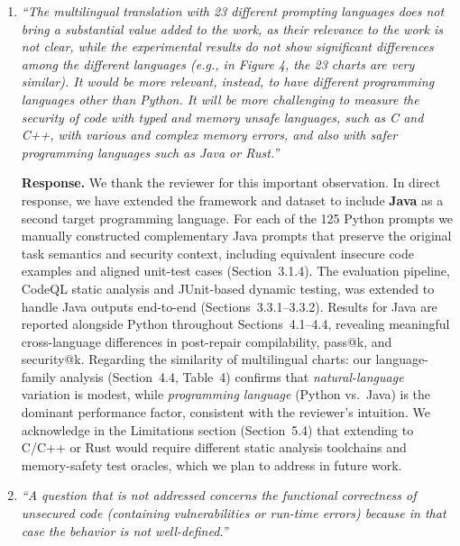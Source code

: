 \documentclass[12pt]{article}
\begin{document}
\begin{enumerate}[leftmargin=*, label=\textbf{R1.\arabic*.}]

\item \textit{``The multilingual translation with 23 different prompting languages does
not bring a substantial value added to the work, as their relevance to the work is not
clear, while the experimental results do not show significant differences among the
different languages (e.g., in Figure 4, the 23 charts are very similar). It would be
more relevant, instead, to have different programming languages other than Python. It
will be more challenging to measure the security of code with typed and memory unsafe
languages, such as C and C++, with various and complex memory errors, and also with
safer programming languages such as Java or Rust.''}

\textbf{Response.}
We thank the reviewer for this important observation. In direct response, we have
extended the framework and dataset to include \textbf{Java} as a second target
programming language. For each of the 125 Python prompts we manually constructed
complementary Java prompts that preserve the original task semantics and security
context, including equivalent insecure code examples and aligned unit-test cases
(Section~3.1.4). The evaluation pipeline, CodeQL static analysis and JUnit-based
dynamic testing, was extended to handle Java outputs end-to-end
(Sections~3.3.1--3.3.2). Results for Java are reported alongside Python throughout
Sections~4.1--4.4, revealing meaningful cross-language differences in post-repair
compilability, pass@k, and security@k. Regarding the similarity of multilingual
charts: our language-family analysis (Section~4.4, Table~4) confirms that
\textit{natural-language} variation is modest, while \textit{programming language}
(Python vs.\ Java) is the dominant performance factor, consistent with the
reviewer's intuition. We acknowledge in the Limitations section (Section~5.4) that
extending to C/C++ or Rust would require different static analysis toolchains and
memory-safety test oracles, which we plan to address in future work.

\item \textit{``A question that is not addressed concerns the functional correctness of
unsecured code (containing vulnerabilities or run-time errors) because in that case the
behavior is not well-defined.''}


\end{enumerate}
\end{document}
